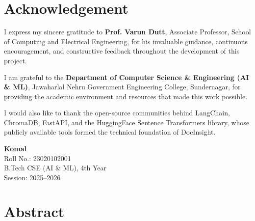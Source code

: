 \documentclass[a4paper,12pt]{report}
\begin{document}

\chapter*{Acknowledgement}

I express my sincere gratitude to \textbf{Prof. Varun Dutt}, Associate Professor,
School of Computing and Electrical Engineering, for his invaluable guidance,
continuous encouragement, and constructive feedback throughout the development of
this project.

I am grateful to the \textbf{Department of Computer Science \& Engineering (AI \& ML)},
Jawaharlal Nehru Government Engineering College, Sundernagar, for providing the
academic environment and resources that made this work possible.

I would also like to thank the open-source communities behind LangChain, ChromaDB,
FastAPI, and the HuggingFace Sentence Transformers library, whose publicly available
tools formed the technical foundation of DocInsight.

\vspace{1cm}
\begin{flushright}
\textbf{Komal}\\
Roll No.: 23020102001\\
B.Tech CSE (AI \& ML), 4th Year\\
Session: 2025--2026
\end{flushright}

\tableofcontents
{}

\listoffigures
{}

\listoftables
{}

\chapter*{Abstract}
\end{document}
